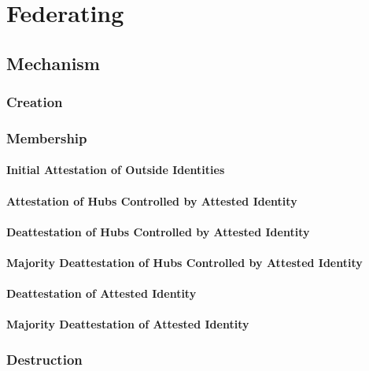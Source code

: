 \chapter{Federating}

\section{Mechanism}

\subsection{Creation}

\subsection{Membership}

\subsubsection{Initial Attestation of Outside Identities}

\subsubsection{Attestation of Hubs Controlled by Attested Identity}

\subsubsection{Deattestation of Hubs Controlled by Attested Identity}

\subsubsection{Majority Deattestation of Hubs Controlled by Attested Identity}

\subsubsection{Deattestation of Attested Identity}

\subsubsection{Majority Deattestation of Attested Identity}

\subsection{Destruction}

